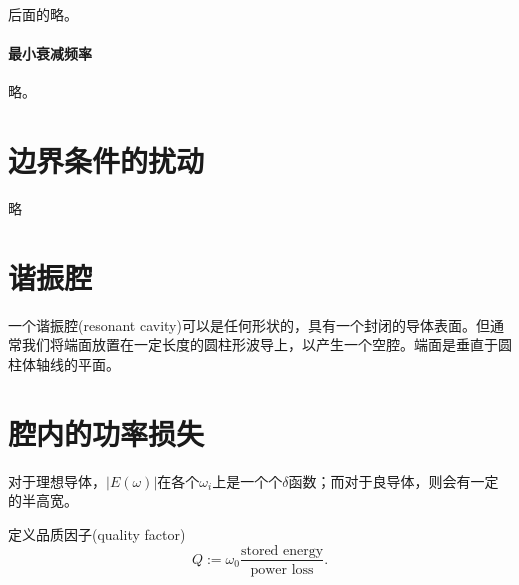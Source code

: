 后面的略。
\paragraph{最小衰减频率}
略。
\section{边界条件的扰动}
略
\section{谐振腔}
一个谐振腔(resonant cavity)可以是任何形状的，具有一个封闭的导体表面。但通常我们将端面放置在一定长度的圆柱形波导上，以产生一个空腔。端面是垂直于圆柱体轴线的平面。





\section{腔内的功率损失}
对于理想导体，$|E(\omega)|$在各个$\omega_i$上是一个个$\delta$函数；而对于良导体，则会有一定的半高宽。

定义品质因子(quality factor)
\begin{equation}
    Q:=\omega_0\frac{\text{stored energy}}{\text{power loss}}.
\end{equation}

